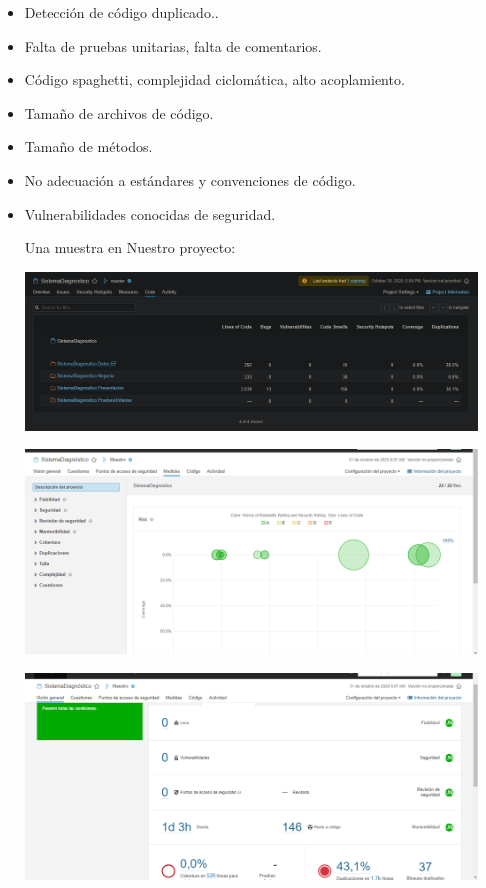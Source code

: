 \documentclass[preprint,12pt]{elsarticle}
\begin{document}
\begin{itemize}
	\item Detección de código duplicado..
	\item Falta de pruebas unitarias, falta de comentarios. 
	\item Código spaghetti, complejidad ciclomática, alto acoplamiento.
	\item Tamaño de archivos de código.
	\item Tamaño de métodos.
	\item No adecuación a estándares y convenciones de código.
	\item Vulnerabilidades conocidas de seguridad.
	
	Una muestra en Nuestro proyecto:
		
\begin{center}
	\includegraphics[width=12cm]{./imagen/Screenshot_2020-10-30 Code.png}
\end{center}
\begin{center}
	\includegraphics[width=12cm]{./imagen/foto1.png}
\end{center}
\begin{center}
	\includegraphics[width=12cm]{./imagen/foto2.png} 

\end{center}
\end{itemize}
\end{document}
